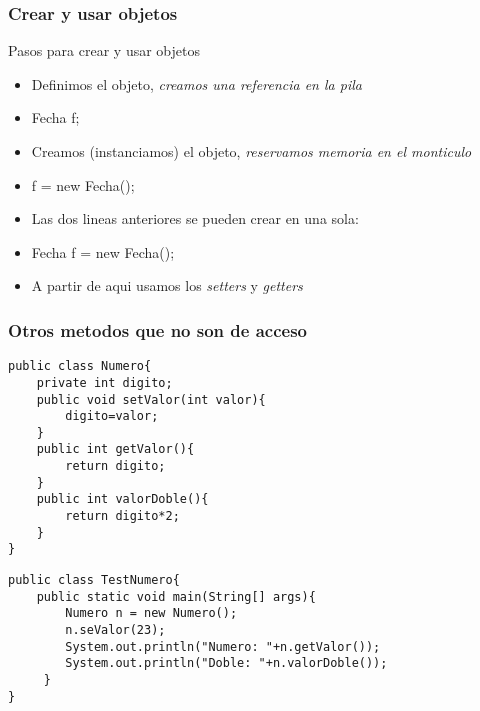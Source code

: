 \documentclass{beamer}
\begin{document}
\begin{frame}
\frametitle{Crear y usar objetos}
\begin{block}{Pasos para crear y usar objetos}
\begin{itemize}[<+-| alert@+>]
\item Definimos el objeto, \emph{creamos una referencia en la pila}
\item Fecha f;
\item Creamos (instanciamos) el objeto, \emph{reservamos memoria en el monticulo}
\item f = new Fecha();
\item Las dos lineas anteriores se pueden crear en una sola:
\item Fecha f = new Fecha();
\item A partir de aqui usamos los \emph{setters} y \emph{getters}
\end{itemize}
\end{block}
\pause
\end{frame}




\begin{frame}[fragile]
    \frametitle{Otros metodos que no son de acceso}
 \begin{footnotesize}
   \begin{verbatim}
public class Numero{
    private int digito;
    public void setValor(int valor){
        digito=valor;
    }
    public int getValor(){
        return digito;
    }
    public int valorDoble(){
        return digito*2;
    }
}
\end{verbatim}
\pause
\begin{verbatim}
public class TestNumero{
    public static void main(String[] args){
        Numero n = new Numero();
        n.seValor(23);
        System.out.println("Numero: "+n.getValor());
        System.out.println("Doble: "+n.valorDoble());
     }
}
\end{verbatim} 
\end{footnotesize}  
\end{frame}
\end{document}

